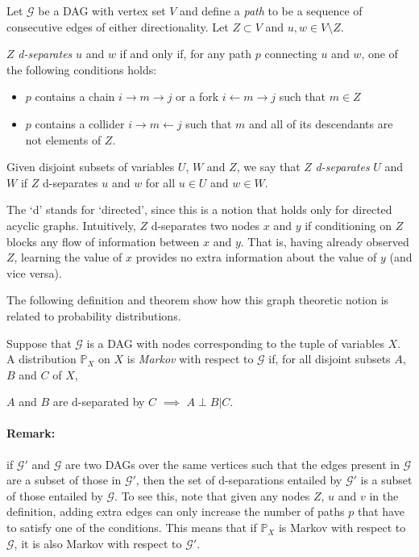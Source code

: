 \begin{definition}[d-separation]\label{def:d-sep}\citep{pearl2009causality}
Let $\mathcal{G}$ be a DAG with vertex set $V$ and define a \emph{path} to be a sequence of consecutive edges of either directionality. 
Let $Z \subset V$ and $u, w \in V \setminus Z$. 

$Z$ \emph{d-separates} $u$ and $w$ if and only if, for any path $p$
connecting $u$ and $w$, one of the following conditions holds:

\begin{itemize}
\item $p$ contains a chain $i \rightarrow m \rightarrow j$ or a fork $i \leftarrow m \rightarrow j$ such that $m \in Z$
\item $p$ contains a collider $i \rightarrow m \leftarrow j$ such that $m$ and all of its descendants
are not elements of $Z$.
\end{itemize}

Given disjoint subsets of variables $U$, $W$ and $Z$, we say that $Z$ \emph{d-separates} $U$ and $W$ if $Z$ d-separates $u$ and $w$ for all $u \in U$ and $w \in W$.
\end{definition}

The `d' stands for `directed', since this is a notion that holds only for directed acyclic graphs.
Intuitively, $Z$ d-separates two nodes $x$ and $y$ if conditioning on $Z$ blocks any flow of information between $x$ and $y$. That is, having already observed $Z$, learning the value of $x$ provides no extra information about the value of $y$ (and vice versa).

The following definition and theorem show how this graph theoretic notion is related to probability distributions.
\\

\begin{definition}[Markov]\cite{cite something?}
Suppose that $\mathcal{G}$ is a DAG with nodes corresponding to the tuple of variables $X$. 
A distribution $\mathbb{P}_X$ on $X$ is \emph{Markov} with respect to $\mathcal{G}$ if, for all
disjoint subsets $A$, $B$ and $C$ of $X$, 
\begin{center}
$A$ and $B$ are d-separated by $C$ $\implies$ $A \perp B | C$.
\end{center}
\end{definition}
\medskip

\paragraph{Remark:} if $\mathcal{G}'$ and $\mathcal{G}$ are two DAGs over the same vertices such that the edges present in $\mathcal{G}$ are a subset of those in $\mathcal{G}'$, then the set of d-separations entailed by $\mathcal{G}'$ is a subset of those entailed by $\mathcal{G}$. To see this, note that given any nodes $Z$, $u$ and $v$ in the definition, adding extra edges can only increase the number of paths $p$ that have to satisfy one of the conditions. 
This means that if $\mathbb{P}_X$ is Markov with respect to $\mathcal{G}$, it is also Markov with respect to $\mathcal{G}'$.
\medskip


